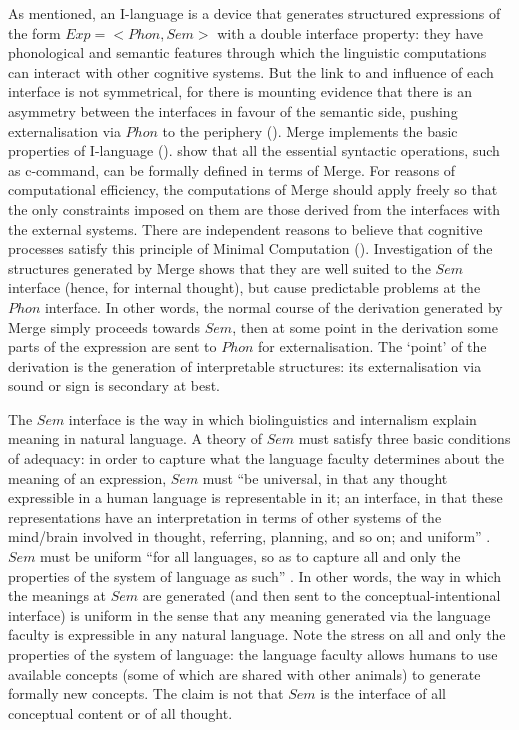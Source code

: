 As mentioned, an I-language is a device that generates structured expressions of the form $Exp = <Phon,Sem>$ with a double interface property: they have phonological and semantic features through which the linguistic computations can interact with other cognitive systems. But the link to and influence of each interface is not symmetrical, for there is mounting evidence that there is an asymmetry between the interfaces in favour of the semantic side, pushing externalisation via $Phon$ to the periphery (\citealt{Chomsky2013,BerwickChomsky2016,Chomsky2016a,Asoulin2016,Asoulin2020}). Merge implements the basic properties of I-language (\citealt{ChomskyGallegoOtt2019}). \citet{CollinsStabler2016} show that all the essential syntactic operations, such as c-command, can be formally defined in terms of Merge. For reasons of computational efficiency, the computations of Merge should apply freely so that the only constraints imposed on them are those derived from the interfaces with the external systems. There are independent reasons to believe that cognitive processes satisfy this principle of Minimal Computation (\citealt{Cherniak1994,CherniakNodelman2002,Chomsky2016a}). Investigation of the structures generated by Merge shows that they are well suited to the $Sem$ interface (hence, for internal thought), but cause predictable problems at the $Phon$ interface. In other words, the normal course of the derivation generated by Merge simply proceeds towards $Sem$, then at some point in the derivation some parts of the expression are sent to $Phon$ for externalisation. The ‘point’ of the derivation is the generation of interpretable structures: its externalisation via sound or sign is secondary at best. 

The $Sem$ interface is the way in which biolinguistics and internalism explain meaning in natural language. A theory of $Sem$ must satisfy three basic conditions of adequacy: in order to capture what the language faculty determines about the meaning of an expression, $Sem$ must “be universal, in that any thought expressible in a human language is representable in it; an interface, in that these representations have an interpretation in terms of other systems of the mind/brain involved in thought, referring, planning, and so on; and uniform” \citep[21]{Chomsky1995}. $Sem$ must be uniform “for all languages, so as to capture all and only the properties of the system of language as such” \citep[21]{Chomsky1995}. In other words, the way in which the meanings at $Sem$ are generated (and then sent to the conceptual-intentional interface) is uniform in the sense that any meaning generated via the language faculty is expressible in any natural language. Note the stress on all and only the properties of the system of language: the language faculty allows humans to use available concepts (some of which are shared with other animals) to generate formally new concepts. The claim is not that $Sem$ is the interface of all conceptual content or of all thought.
	
